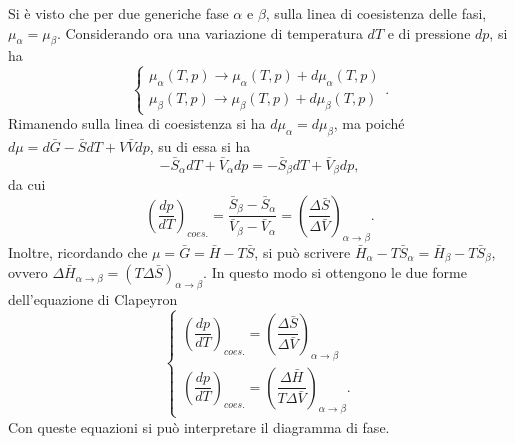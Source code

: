 Si è visto che per due generiche fase $\alpha$ e $\beta$, sulla linea di
coesistenza delle fasi, $\mu_\alpha=\mu_\beta$. Considerando ora una variazione di temperatura $dT$ e di pressione $dp$, si ha
\begin{equation}
    \begin{cases}
        \mu_\alpha\left(T,p\right)\to\mu_\alpha\left(T,p\right)+d\mu_\alpha\left(T,p\right) \\ \mu_\beta\left(T,p\right)\to\mu_\beta\left(T,p\right)+d\mu_\beta\left(T,p\right)
    \end{cases}.
\end{equation}
Rimanendo sulla linea di coesistenza si ha $d\mu_\alpha=d\mu_\beta$, ma poiché $d\mu=d\bar{G}-\bar{S}dT+V\bar{V}dp$, su di essa si ha
\begin{equation}
    -\bar{S}_\alpha dT+\bar{V}_\alpha dp=-\bar{S}_\beta dT+\bar{V}_\beta dp,
\end{equation}
da cui
\begin{equation}
    \left(\frac{dp}{dT}\right)_{coes.}=\frac{\bar{S}_\beta-\bar{S}_\alpha}{\bar{V}_\beta-\bar{V}_\alpha}=\left(\frac{\Delta \bar{S}}{\Delta \bar{V}}\right)_{\alpha\to\beta}.
\end{equation}
Inoltre, ricordando che $\mu=\bar{G}=\bar{H}-T\bar{S}$, si può scrivere $\bar{H}_\alpha-T\bar{S}_\alpha=\bar{H}_\beta-T\bar{S}_\beta$, ovvero $\Delta \bar{H}_{\alpha\to\beta}=\left(T\Delta \bar{S}\right)_{\alpha\to\beta}$. In questo modo si ottengono le due forme dell'equazione di Clapeyron
\begin{equation}
    \begin{cases}
        \left(\dfrac{dp}{dT}\right)_{coes.}=\left(\dfrac{\Delta \bar{S}}{\Delta \bar{V}}\right)_{\alpha\to\beta} \\
        \left(\dfrac{dp}{dT}\right)_{coes.}=\left(\dfrac{\Delta \bar{H}}{T\Delta \bar{V}}\right)_{\alpha\to\beta}.
    \end{cases}
\end{equation}
Con queste equazioni si può interpretare il diagramma di fase. 


